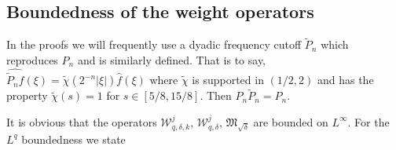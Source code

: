\documentclass[11pt]{amsart}
\theoremstyle{definition}
\numberwithin{theorem}{section}
\numberwithin{definition}{section}
\def\fM{{\mathfrak {M}}}
\def\cW{{\mathcal {W}}}
\begin{document}
\subsection*{Boundedness of the weight operators}
In the proofs we will frequently use a dyadic frequency cutoff
 $\widetilde P_n$  which reproduces $P_n$ and is similarly defined.
That is to say, $\widehat {\widetilde P_n f}(\xi)=\widetilde \chi(2^{-n}|\xi|)\widehat f(\xi)$
where $\widetilde \chi$  is supported in $(1/2,2)$ and has the property
$\widetilde \chi(s)=1$ for $s\in [5/8, 15/8]$.
Then $P_n\widetilde P_n=P_n$.



It is obvious that the  operators $\cW^j_{q,\delta,k}$,
$\cW^j_{q,\delta}$, $\fM_{\sqrt\delta}$ are bounded on $L^\infty$.
For the $L^q$ boundedness   we state
\end{document}
